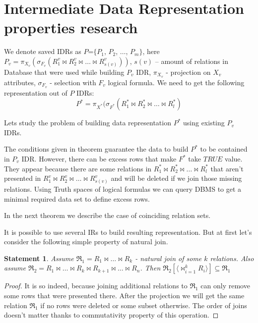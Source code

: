 \documentclass[10pt,a4paper]{article}
\newtheorem{statement}{Statement}
\def \n #1{\mathit{#1}}
\begin{document}
\section{Intermediate Data Representation properties research}

We denote saved IDRs as $P$=$\{ P_1$, $P_2$, $\dots$, $P_m \}$, here $P_v = \pi_{X_v}(\sigma_{F_v} (R^v_1 \Join R^v_2 \Join \dots \Join R^v_{s(v)} ))$,
$s(v)$ – amount of relations in Database that were used while building $P_v$ IDR,
$\pi_{X_v}$ - projection on $X_v$ attributes, $\sigma_{F_v}$ - selection with $F_v$ logical formula. We need to get the following representation out of $P$ IDRs:
$$P^{\ast} = \pi_{X^{\ast}}(\sigma_{F^{\ast}} (R^{\ast}_1 \Join R^{\ast}_2\Join \dots \Join R^{\ast}_l )$$

Lets study the problem of building data representation $P^{\ast}$ using existing $P_v$ IDRs.



The conditions given in theorem guarantee the data to build $P^{\ast}$ to be contained in $P_v$ IDR. However, there can be excess rows that make $F^{\ast}$ take $\n{TRUE}$ value. They appear because there are some relations in $R^{\ast}_1 \Join R^{\ast}_2\Join \dots \Join R^{\ast}_l $ that aren't presented in $R^v_1 \Join R^v_2 \Join \dots \Join R^v_{s(v)} $ and will be deleted if we join those missing relations. Using Truth spaces of logical formulas we can query DBMS to get a minimal required data set to define excess rows.

In the next theorem we describe the case of coinciding relation sets.



It is possible to use several IRs to build resulting representation. But at first let's consider the following simple property of natural join.

\begin{statement}
Assume $\Re_1 = R_1 \Join \dots \Join R_k$ - natural join of some $k$ relations. Also assume $\Re_2 = R_1 \Join \dots \Join R_k \Join R_{k+1} \Join \dots \Join R_{n}$. Then $\Re_2 [\langle \Join_{i=1}^{k} R_i \rangle] \subseteq \Re_1$
\label{join_property}
\end{statement}
\begin{proof}
It is so indeed, because joining additional relations to $\Re_1$ can only remove some rows that were presented there. After the projection we will get the same relation $\Re_1$ if no rows were deleted or some subset otherwise. The order of joins doesn't matter thanks to commutativity property of this operation.
\end{proof}
\end{document}
